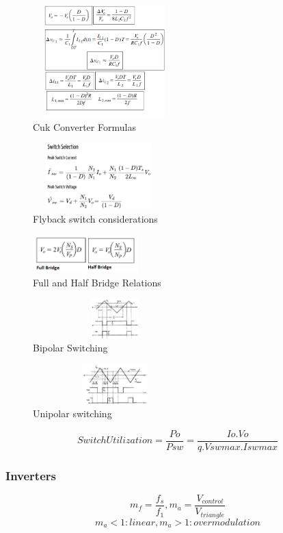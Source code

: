 \documentclass[twocolumn, ]{article}
\begin{document}
\begin{figure}[!ht]
	\includegraphics[width=2.2in,height=1.7in]{cukformulas.png}
	\caption{Cuk Converter Formulas}
\end{figure}

  \begin{figure}[!ht]
	\includegraphics[width=2in,height=1in]{flybak_switch}
	\caption{Flyback switch considerations}
\end{figure}

\begin{figure}[!ht]
	\includegraphics[width=1.6in,height=.6in]{fullandhalfinout.png}
	\caption{Full and Half Bridge Relations}
\end{figure}
\begin{figure}[!ht]
	\includegraphics[width=2.5in,height=0.6in]{bipolar1.png}
	\caption{Bipolar Switching}
\end{figure}
\begin{figure}[!ht]
	\includegraphics[width=2.5in,height=0.6in]{unipolar1.png}
	\caption{Unipolar switching}
\end{figure}

\begin{equation}
Switch Utilization= \frac{Po}{Psw}=\frac{Io.Vo}{q.Vswmax.Iswmax}
\end{equation}

\subsubsection*{Inverters}

$$ m_f=\dfrac{f_s}{f_1}, m_a=\dfrac{V_{control}}{V_{triangle}}$$
$$m_a<1: linear, m_a>1: overmodulation$$
\end{document}
